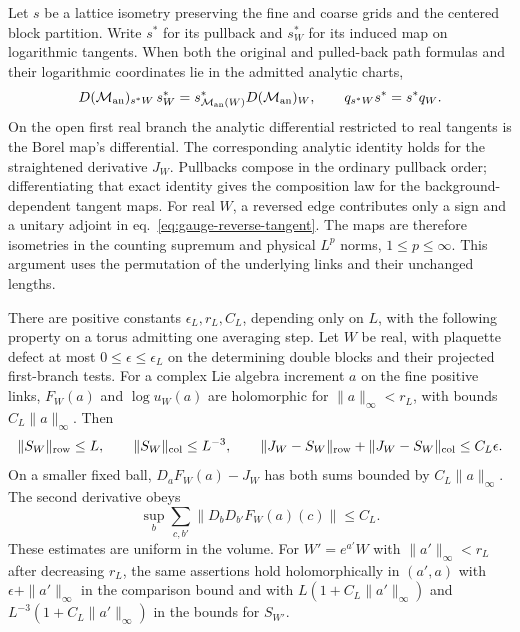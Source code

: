 \documentclass[11pt,letterpaper,reqno]{amsart}
\makeatletter
\numberwithin{equation}{section}
\renewcommand{\eqref}[1]{\textup{eq.~\ref{#1}}}
\theoremstyle{definition}
\newcommand{\ms@minorstart}{%
  \pushQED{\qed}\renewcommand{\qedsymbol}{$\blacksquare$}}
\newenvironment{proposition}[1][]{\ms@minorstart\ms@proposition[#1]}
  {\popQED\endms@proposition}
\theoremstyle{remark}
\makeatother
\begin{document}
Let \(s\) be a lattice isometry preserving the fine and coarse
grids and the centered block partition. Write \(s^*\) for its
pullback and \(s_W^*\) for its induced map on logarithmic tangents.
When both the original and pulled-back path formulas and their
logarithmic coordinates lie in the admitted analytic charts,
\begin{equation}\label{eq:gauge-isometry-laws}
 D(\mathcal M_{\rm an})_{s^*W}\,s_W^*
  =s_{\mathcal M_{\rm an}(W)}^*D(\mathcal M_{\rm an})_W,
 \qquad q_{s^*W}s^*=s^*q_W.
\end{equation}
On the open first real branch the analytic differential restricted
to real tangents is the Borel map's differential. The corresponding
analytic identity holds for the straightened derivative \(J_W\).
Pullbacks compose in the
ordinary pullback order; differentiating that exact identity gives
the composition law for the background-dependent tangent maps.
For real $W$, a reversed edge contributes only a sign and a unitary
adjoint in \eqref{eq:gauge-reverse-tangent}. The maps are therefore
isometries in the counting supremum and physical $L^p$ norms,
$1\le p\le\infty$. This argument uses the permutation of the
underlying links and their unchanged lengths.

\begin{proposition}[One-step derivative]\label{prop:gauge-one-step}
There are positive constants \(\epsilon_L,r_L,C_L\), depending
only on \(L\), with the following property on a torus admitting
one averaging step. Let \(W\) be real, with plaquette defect at most
\(0\le\epsilon\le\epsilon_L\) on the determining double blocks and
their projected first-branch tests. For a complex Lie algebra
increment \(a\) on the fine positive links, \(F_W(a)\) and
\(\log u_W(a)\) are
holomorphic for \(\|a\|_\infty<r_L\), with bounds
\(C_L\|a\|_\infty\). Then
\[
 \|S_W\|_{\rm row}\le L,\qquad
 \|S_W\|_{\rm col}\le L^{-3},\qquad
 \|J_W-S_W\|_{\rm row}+\|J_W-S_W\|_{\rm col}
 \le C_L\epsilon .
\]
On a smaller fixed ball, \(D_aF_W(a)-J_W\) has both sums bounded
by \(C_L\|a\|_\infty\). The second derivative obeys
\[
 \sup_b\sum_{c,b'}\|D_bD_{b'}F_W(a)(c)\|\le C_L.
\]
These estimates are uniform in the volume. For \(W'=e^{a'}W\) with
\(\|a'\|_\infty<r_L\) after decreasing \(r_L\), the same assertions
hold holomorphically in \((a',a)\) with
\(\epsilon+\|a'\|_\infty\) in the comparison bound and with
\(L(1+C_L\|a'\|_\infty)\) and
\(L^{-3}(1+C_L\|a'\|_\infty)\) in the bounds for \(S_{W'}\).
\end{proposition}
\end{document}
